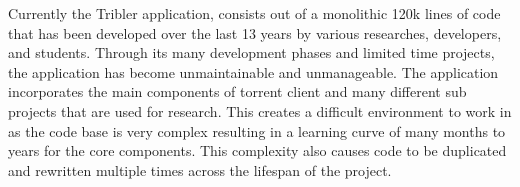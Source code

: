 

Currently the Tribler application, consists out of a monolithic 120k lines of code that has been developed over the last 13 years by various researches, developers, and students. Through its many development phases and limited time projects, the application has become unmaintainable and unmanageable. The application incorporates the main components of torrent client and many different sub projects that are used for research. This creates a difficult environment to work in as the code base is very complex resulting in a learning curve of many months to years for the core components. This complexity also causes code to be duplicated and rewritten multiple times across the lifespan of the project.

